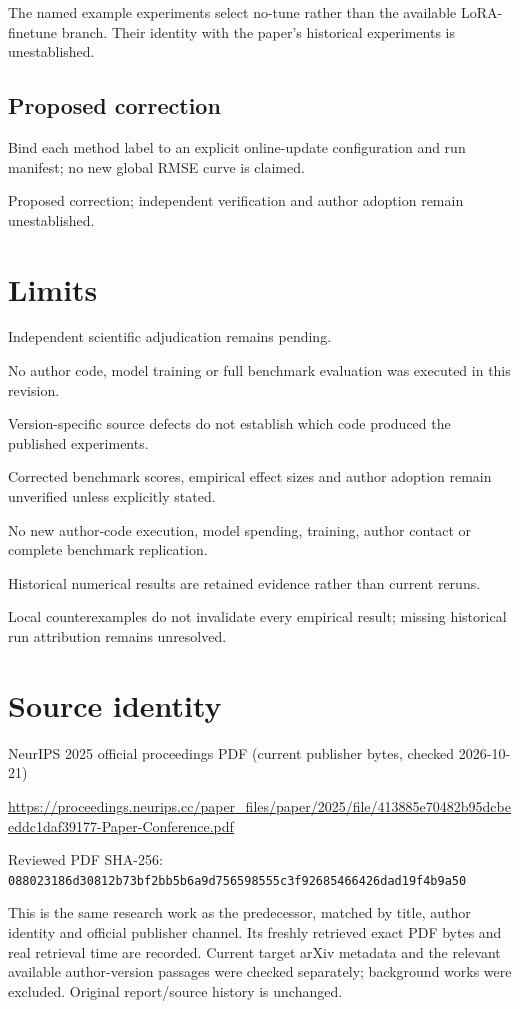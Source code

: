 \documentclass[11pt]{article}
\begin{document}
The named example experiments select no-tune rather than the available LoRA-finetune branch. Their identity with the paper’s historical experiments is unestablished.

\subsection*{Proposed correction}

Bind each method label to an explicit online-update configuration and run manifest; no new global RMSE curve is claimed.

Proposed correction; independent verification and author adoption remain unestablished.

\section*{Limits}

Independent scientific adjudication remains pending.\par

No author code, model training or full benchmark evaluation was executed in this revision.\par

Version-specific source defects do not establish which code produced the published experiments.\par

Corrected benchmark scores, empirical effect sizes and author adoption remain unverified unless explicitly stated.\par

No new author-code execution, model spending, training, author contact or complete benchmark replication.\par

Historical numerical results are retained evidence rather than current reruns.\par

Local counterexamples do not invalidate every empirical result; missing historical run attribution remains unresolved.\par

\section*{Source identity}

NeurIPS 2025 official proceedings PDF (current publisher bytes, checked 2026-10-21)

\url{https://proceedings.neurips.cc/paper_files/paper/2025/file/413885e70482b95dcbeeddc1daf39177-Paper-Conference.pdf}

Reviewed PDF SHA-256: \nolinkurl{088023186d30812b73bf2bb5b6a9d756598555c3f92685466426dad19f4b9a50}

This is the same research work as the predecessor, matched by title, author identity and official publisher channel. Its freshly retrieved exact PDF bytes and real retrieval time are recorded. Current target arXiv metadata and the relevant available author-version passages were checked separately; background works were excluded. Original report/source history is unchanged.
\end{document}
